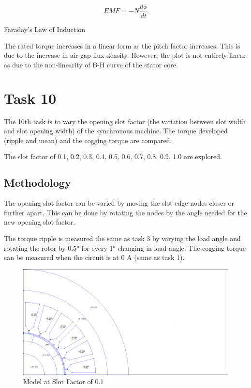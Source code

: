 \documentclass[12pt]{article}
\begin{document}
\begin{eqfloat}[H]
    \begin{equation}\label{eq:faradays}
        EMF = - N \frac{d\phi}{dt}
    \end{equation}
    \caption{Faraday's Law of Induction}
\end{eqfloat}

The rated torque increases in a linear form as the pitch factor increases. This is due to the increase in air gap flux density. However, the plot is not entirely linear as due to the non-linearity of B-H curve of the stator core.

\section{Task 10}

The 10th task is to vary the opening slot factor (the variation between slot width and slot opening width) of the synchronous machine. The torque developed (ripple and mean) and the cogging torque are compared.

The slot factor of 0.1, 0.2, 0.3, 0.4, 0.5, 0.6, 0.7, 0.8, 0.9, 1.0 are explored.

\subsection{Methodology}

The opening slot factor can be varied by moving the slot edge nodes closer or further apart. This can be done by rotating the nodes by the angle needed for the new opening slot factor.

The torque ripple is measured the same as task 3 by varying the load angle and rotating the rotor by \ang{0.5} for every \ang{1} changing in load angle. The cogging torque can be measured when the circuit is at 0 A (same as task 1).

\begin{figure}[H]
    \centering
    \includegraphics[height=0.8\linewidth, trim={0 0 22.5cm 1}, clip]{img/task_10_models/task_10_0.1.png}
    \caption{Model at Slot Factor of 0.1}
    \label{fig:task-10-0.1-sf}
\end{figure}
\end{document}
